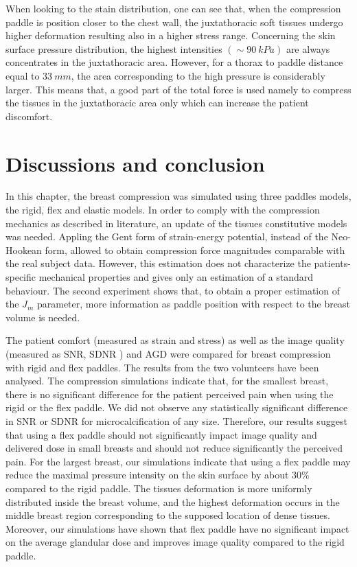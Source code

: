 When looking to the stain distribution, one can see that, when the compression paddle is position closer to the chest wall, the juxtathoracic soft tissues undergo higher deformation resulting also in a higher stress range. Concerning the skin surface pressure distribution, the highest intensities $ (\sim 90\ kPa)$ are always concentrates in the juxtathoracic area. However, for a thorax to paddle distance equal to $33\ mm$, the area corresponding to the high pressure is considerably larger. This means that, a good part of the total force is used namely to compress the tissues in the juxtathoracic area only which can increase the patient discomfort.



\section{Discussions and conclusion}\label{section:compressionfem:conclusion}

In this chapter, the breast compression was simulated using three paddles models, the rigid, flex and elastic models. In order to comply with the compression mechanics as described in literature, an update of the tissues constitutive models was needed. Appling the Gent form of strain-energy potential, instead of the Neo-Hookean form, allowed to obtain compression force magnitudes comparable with the real subject data.  
However, this estimation does not characterize the patients-specific mechanical properties and gives only an estimation of a standard behaviour.  The second experiment shows that, to obtain a proper estimation of the $J_m$ parameter, more information as paddle position with respect to the breast volume is needed. 

The patient comfort (measured as strain and stress) as well as the image quality (measured as SNR, SDNR ) and AGD were compared for breast compression with rigid and flex paddles. The results from the two volunteers have been analysed. The compression simulations indicate that, for the smallest breast, there is no significant difference for the patient perceived pain when using the rigid or the flex paddle. We did not observe any statistically significant difference in SNR or SDNR for microcalcification of any size. Therefore, our results suggest that using a flex paddle should not significantly impact image quality and delivered dose in small breasts and should not reduce significantly the perceived pain.   
For the largest breast, our simulations indicate that using a flex paddle may reduce the maximal pressure intensity on the skin surface by about 30\% compared to the rigid paddle. The tissues deformation is more uniformly distributed inside the breast volume, and the highest deformation occurs in the middle breast region corresponding to the supposed location of dense tissues. Moreover, our simulations have shown that flex paddle have no significant impact on the average glandular dose and improves image quality compared to the rigid paddle. 


